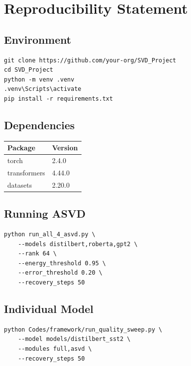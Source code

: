 
\section{Reproducibility Statement}

\subsection{Environment}

\begin{lstlisting}
git clone https://github.com/your-org/SVD_Project
cd SVD_Project
python -m venv .venv
.venv\Scripts\activate
pip install -r requirements.txt
\end{lstlisting}

\subsection{Dependencies}

\begin{table}[H]
\centering
\small
\begin{tabular}{ll}
\toprule
\textbf{Package} & \textbf{Version} \\
\midrule
torch & 2.4.0 \\
transformers & 4.44.0 \\
datasets & 2.20.0 \\
\bottomrule
\end{tabular}
\end{table}

\subsection{Running ASVD}

\begin{lstlisting}
python run_all_4_asvd.py \
    --models distilbert,roberta,gpt2 \
    --rank 64 \
    --energy_threshold 0.95 \
    --error_threshold 0.20 \
    --recovery_steps 50
\end{lstlisting}

\subsection{Individual Model}

\begin{lstlisting}
python Codes/framework/run_quality_sweep.py \
    --model models/distilbert_sst2 \
    --modules full,asvd \
    --recovery_steps 50
\end{lstlisting}

